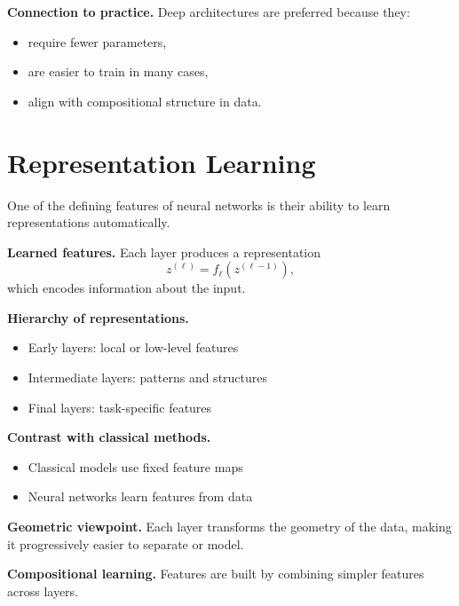 \medskip

\noindent
\textbf{Connection to practice.}  
Deep architectures are preferred because they:
\begin{itemize}
    \item require fewer parameters,
    \item are easier to train in many cases,
    \item align with compositional structure in data.
\end{itemize}

\section{Representation Learning}

One of the defining features of neural networks is their ability to learn representations automatically.

\medskip

\noindent
\textbf{Learned features.}  
Each layer produces a representation
\[
z^{(\ell)} = f_\ell(z^{(\ell-1)}),
\]
which encodes information about the input.

\medskip

\noindent
\textbf{Hierarchy of representations.}
\begin{itemize}
    \item Early layers: local or low-level features
    \item Intermediate layers: patterns and structures
    \item Final layers: task-specific features
\end{itemize}

\medskip

\noindent
\textbf{Contrast with classical methods.}
\begin{itemize}
    \item Classical models use fixed feature maps
    \item Neural networks learn features from data
\end{itemize}

\medskip

\noindent
\textbf{Geometric viewpoint.}  
Each layer transforms the geometry of the data, making it progressively easier to separate or model.

\medskip

\noindent
\textbf{Compositional learning.}  
Features are built by combining simpler features across layers.

\medskip

